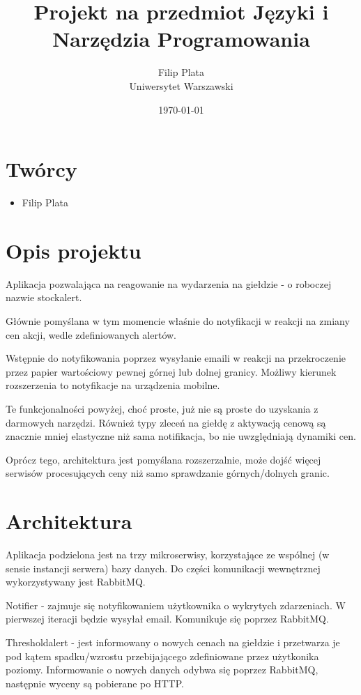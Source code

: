 \documentclass[12pt]{article}
\title{Projekt na przedmiot Języki i Narzędzia Programowania}
\author{
        Filip Plata \\
        Uniwersytet Warszawski
}
\date{\today}
\begin{document}
\maketitle

\section{Twórcy}

\begin{itemize}
\item Filip Plata
\end{itemize}

\section{Opis projektu}

Aplikacja pozwalająca na reagowanie na wydarzenia na giełdzie - o roboczej nazwie stockalert.

Głównie pomyślana w tym momencie właśnie do notyfikacji w reakcji na zmiany cen akcji, wedle zdefiniowanych alertów.

Wstępnie do notyfikowania poprzez wysyłanie emaili w reakcji na przekroczenie przez papier wartościowy pewnej górnej lub dolnej granicy.
Możliwy kierunek rozszerzenia to notyfikacje na urządzenia mobilne.

Te funkcjonalności powyżej, choć proste, już nie są proste do uzyskania z darmowych narzędzi. Również typy zleceń na giełdę z aktywacją cenową są znacznie mniej elastyczne niż sama notifikacja, bo nie uwzględniają dynamiki cen.

Oprócz tego, architektura jest pomyślana rozszerzalnie, może dojść więcej serwisów procesujących ceny niż samo sprawdzanie górnych/dolnych granic.

\section{Architektura}

Aplikacja podzielona jest na trzy mikroserwisy, korzystające ze wspólnej (w sensie instancji serwera) bazy danych. Do części komunikacji wewnętrznej wykorzystywany jest RabbitMQ.

Notifier - zajmuje się notyfikowaniem użytkownika o wykrytych zdarzeniach. W pierwszej iteracji będzie wysyłał email. Komunikuje się poprzez RabbitMQ.

Thresholdalert - jest informowany o nowych cenach na giełdzie i przetwarza je pod kątem spadku/wzrostu przebijającego zdefiniowane przez użytkonika poziomy. Informowanie o nowych danych odybwa się poprzez RabbitMQ, następnie wyceny są pobierane po HTTP.
\end{document}
